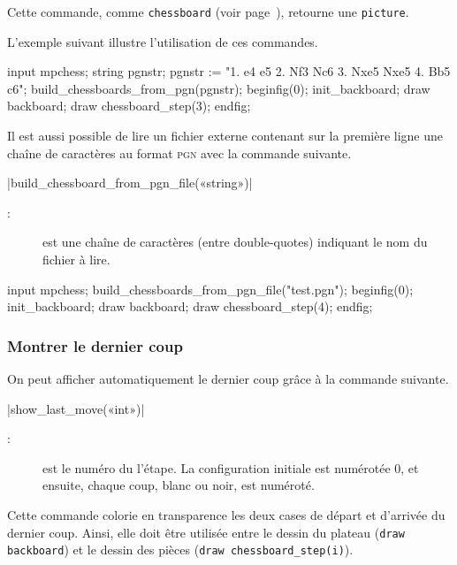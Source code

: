\documentclass[french]{ltxdoc}
\begin{document}
Cette commande, comme \lstinline+chessboard+ (voir page~\pageref{com:chessboard}), retourne une \lstinline+picture+.

L’exemple suivant illustre l’utilisation de ces commandes.

\begin{ExempleMP}
input mpchess;
string pgnstr;
pgnstr := "1. e4 e5 2. Nf3 Nc6 3. Nxe5 Nxe5 4. Bb5 c6";
build_chessboards_from_pgn(pgnstr);
beginfig(0);
init_backboard;
draw backboard;
draw chessboard_step(3); %
endfig;
\end{ExempleMP}

Il est aussi possible de lire un fichier externe contenant sur la première ligne
une chaîne de caractères au format \textsc{pgn} avec la commande suivante. 

\commande|build_chessboard_from_pgn_file(«string»)|\smallskip

\begin{description}
\item[:] est une chaîne de caractères (entre double-quotes)
indiquant le nom du fichier à lire. 
\end{description}

\begin{ExempleMP}
input mpchess;
build_chessboards_from_pgn_file("test.pgn");
beginfig(0);
init_backboard;
draw backboard;
draw chessboard_step(4); %
endfig;
\end{ExempleMP}



\subsubsection{Montrer le dernier coup}

On peut afficher automatiquement le dernier coup grâce à la commande suivante.

\commande|show_last_move(«int»)|\smallskip

\begin{description}
\item[:] est le numéro du l’étape. La configuration initiale est numérotée 0, et ensuite, chaque coup, blanc ou noir, est numéroté.
\end{description}

Cette commande colorie en transparence les deux cases de départ et d’arrivée du dernier coup. Ainsi, elle doit être utilisée entre le dessin du plateau (\lstinline+draw backboard+) et le dessin des pièces (\lstinline+draw chessboard_step(i)+).
\end{document}
